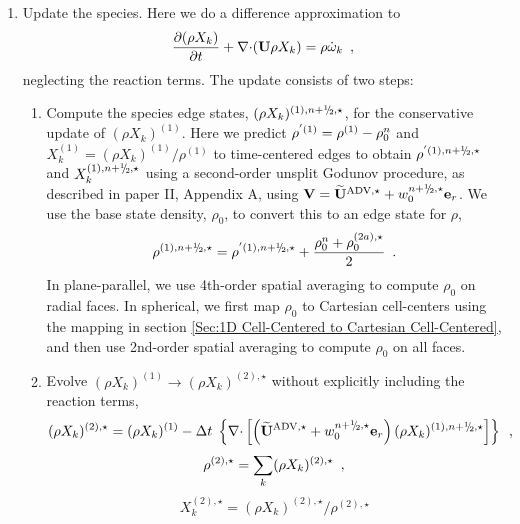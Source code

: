 \begin{description}
\begin{enumerate}
\item Update the species.  Here we do a difference approximation
  to 
  \begin{equation}
  \frac{\partial (\rho X_k)}{\partial t} + \mathbf{\nabla} \mathbf{\cdot} ({\bf U} \rho X_k) =
         \rho {\dot{\omega}}_k \enskip , \label{eq:species}
  \end{equation}
  neglecting the reaction terms.  The update consists of two steps:

  \begin{enumerate}
  \renewcommand{\labelenumii}{{\bf \roman{enumii}}.}

  \item Compute the species edge states, $(\rho X_k)^{(1),\nph,\star}$,
  for the conservative update of $(\rho X_k)^{(1)}$. 
  Here we predict $\rho^{'(1)} = \rho^{(1)} - \rho_0^n$ and 
  $X_k^{(1)} = (\rho X_k)^{(1)} / \rho^{(1)}$ to time-centered edges to obtain 
  $\rho^{'(1),\nph,\star}$ and $X_k^{(1),\nph,\star}$ using a second-order
  unsplit Godunov procedure, as described in paper II,
  Appendix A, using $\Vb = \uadvone+w_0^{\nph,\star} \er$.  We use the base
  state density, $\rho_0$, to convert this to an edge state for $\rho$,
\begin{equation}
\rho^{(1),\nph,\star} = 
\rho^{'(1),\nph,\star} + \frac{\rho_0^n + \rho_0^{(2a),\star}}{2} \enskip .
\label{eq:rhoXedgestate}
\end{equation}
  In plane-parallel, we use 4th-order spatial averaging to compute $\rho_0$ on 
  radial faces.  In spherical, we first map $\rho_0$ to Cartesian cell-centers 
  using the mapping in section \ref{Sec:1D Cell-Centered to Cartesian Cell-Centered}, 
  and then use 2nd-order spatial averaging to compute $\rho_0$ on all faces.

  \item Evolve $(\rho X_k)^{(1)} \rightarrow (\rho X_k)^{(2),\star}$
  without explicitly including the reaction terms,
\begin{equation}
(\rho X_k)^{(2),\star} = (\rho X_k)^{(1)} 
 - \dt \; \left\{ \nablab \cdotb \left[ \left(\uadvone+w_0^{\nph,\star} \er\right)  
  (\rho X_k)^{(1),\nph,\star} \right] \right\} \enskip ,
\end{equation}
\begin{equation}
\rho^{(2),\star} = \sum_k (\rho X_k)^{(2),\star} \enskip ,
\end{equation}
\begin{equation}
X_k^{(2),\star} = (\rho X_k)^{(2),\star} / \rho^{(2),\star}
\end{equation}


\end{enumerate}
\end{enumerate}
\end{description}

